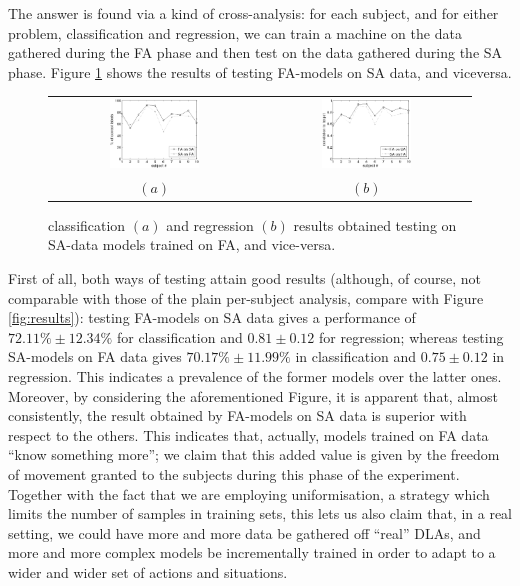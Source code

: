 The answer is found via a kind of cross-analysis: for each subject,
and for either problem, classification and regression, we can train a
machine on the data gathered during the FA phase and then test on the
data gathered during the SA phase. Figure \ref{fig:2on1} shows the
results of testing FA-models on SA data, and viceversa.

\begin{figure}[!ht] \centering
  \begin{tabular}{cc}
    \includegraphics[width=0.45\textwidth]{2on1_class.eps} &
    \includegraphics[width=0.45\textwidth]{2on1_regr.eps} \\
    $(a)$ & $(b)$ \\
  \end{tabular}
  \caption{classification $(a)$ and regression $(b)$ results obtained
    testing on SA-data models trained on FA, and vice-versa.}
  \label{fig:2on1}
\end{figure}

First of all, both ways of testing attain good results (although, of
course, not comparable with those of the plain per-subject analysis,
compare with Figure \ref{fig:results}): testing FA-models on SA data
gives a performance of $72.11\% \pm 12.34\%$ for classification and
$0.81 \pm 0.12$ for regression; whereas testing SA-models on FA data
gives $70.17\% \pm 11.99\%$ in classification and $0.75 \pm 0.12$ in
regression. This indicates a prevalence of the former models over the
latter ones. Moreover, by considering the aforementioned Figure, it is
apparent that, almost consistently, the result obtained by FA-models
on SA data is superior with respect to the others. This indicates
that, actually, models trained on FA data ``know something more''; we
claim that this added value is given by the freedom of movement
granted to the subjects during this phase of the experiment. Together
with the fact that we are employing uniformisation, a strategy which
limits the number of samples in training sets, this lets us also claim
that, in a real setting, we could have more and more data be gathered
off ``real'' DLAs, and more and more complex models be incrementally
trained in order to adapt to a wider and wider set of actions and
situations.

